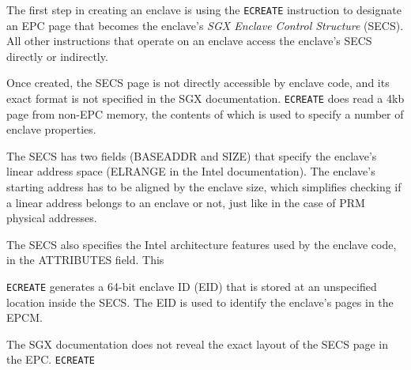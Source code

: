 The first step in creating an enclave is using the \texttt{ECREATE} instruction
to designate an EPC page that becomes the enclave's \textit{SGX Enclave Control
Structure} (SECS). All other instructions that operate on an enclave access the
enclave's SECS directly or indirectly.

Once created, the SECS page is not directly accessible by enclave code, and its
exact format is not specified in the SGX documentation. \texttt{ECREATE} does
read a 4kb page from non-EPC memory, the contents of which is used to specify
a number of enclave properties.

The SECS has two fields (BASEADDR and SIZE) that specify the enclave's linear
address space (ELRANGE in the Intel documentation). The enclave's starting
address has to be aligned by the enclave size, which simplifies checking if a
linear address belongs to an enclave or not, just like in the case of PRM
physical addresses.

The SECS also specifies the Intel architecture features used by the enclave
code, in the ATTRIBUTES field. This

\texttt{ECREATE} generates a 64-bit enclave ID (EID) that is stored at an
unspecified location inside the SECS. The EID is used to identify the enclave's
pages in the EPCM.



The SGX documentation does not reveal the exact layout of the SECS page in the
EPC.  \texttt{ECREATE}







